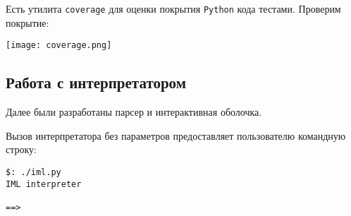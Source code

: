 \documentclass[a4paper,12pt]{article}
\begin{document}
Есть утилита \verb|coverage| для оценки покрытия \verb|Python| кода тестами.
Проверим покрытие:

\texttt{[image: coverage.png]}

\subsection{Работа с интерпретатором}
Далее были разработаны парсер и интерактивная оболочка.

Вызов интерпретатора без параметров предоставляет пользователю командную строку:
\begin{verbatim}
$: ./iml.py
IML interpreter

==>
\end{verbatim}
\end{document}
